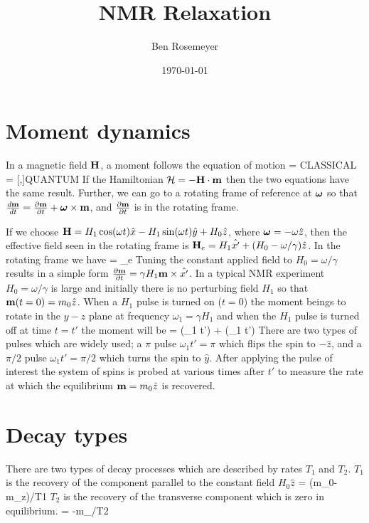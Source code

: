 \documentclass{article}
\begin{document}
\title{NMR Relaxation}
\author{Ben Rosemeyer}
\date{\today}
\maketitle

\section*{Moment dynamics}
In a magnetic field ${\bf H}$, a moment follows the equation of motion 
\bea
{} = \gamma \vm\times\vH\quad CLASSICAL \\
 = [\cH,\vm]\quad QUANTUM
\eea
If the Hamiltonian ${\cal H} = -{\bf H}\cdot{\bf m}$ then the two equations have the same result. Further, we can go to a rotating frame of reference at  $\mbox{\boldmath$\omega$}$ so that $\frac{d{\bf m}}{dt} = \frac{\partial{\bf m}}{\partial t} + \mbox{\boldmath$\omega$}\times{\bf m}$, and $\frac{\partial{\bf m}}{\partial t}$ is in the rotating frame. 

If we choose ${\bf H} = H_1 \cos(\omega t)\hat{x} - H_1 \sin(\omega t)\hat{y} + H_0\hat{z}$, where $\mbox{\boldmath$\omega$}=-\omega\hat{z}$, then the effective field seen in the rotating frame is ${\bf H}_e = H_1\hat{x'} + (H_0 - \omega/\gamma)\hat{z}$. In the rotating frame we have
\bea
{} = \gamma \vm\times\vH_e
\eea
Tuning the constant applied field to $H_0 = \omega/\gamma$ results in a simple form $\frac{\partial{\bf m}}{\partial t} = \gamma H_1 {\bf m}\times \hat{x'}$. In a typical NMR experiment $H_0=\omega/\gamma$ is large and initially there is no perturbing field $H_1$ so that ${\bf m}(t=0)=m_0\hat{z}$. When a $H_1$ pulse is turned on ($t=0$) the moment beings to rotate in the $y-z$ plane at frequency $\omega_1=\gamma H_1$ and when the $H_1$ pulse is turned off at time $t=t'$ the moment will be
\bea
\vm = \cos(\omega_1 t') + \sin(\omega_1 t')
\eea
There are two types of pulses which are widely used; a $\pi$ pulse $\omega_1 t' =\pi$ which flips the spin to $-\hat{z}$, and a $\pi/2$ pulse $\omega_1 t' =\pi/2$ which turns the spin to $\hat{y}$. After applying the pulse of interest the system of spins is probed at various times after $t'$ to measure the rate at which the equilibrium ${\bf m}=m_0\hat{z}$ is recovered.

\section*{Decay types}
There are two types of decay processes which are described by rates $T_1$ and $T_2$. $T_1$ is the recovery of the component parallel to the constant field $H_0\hat{z}$
\bea
{} = (m_0-m_z)/T1
\eea
$T_2$ is the recovery of the transverse component which is zero in equilibrium.
\bea
{} = -m_\perp/T2
\eea
\end{document}
